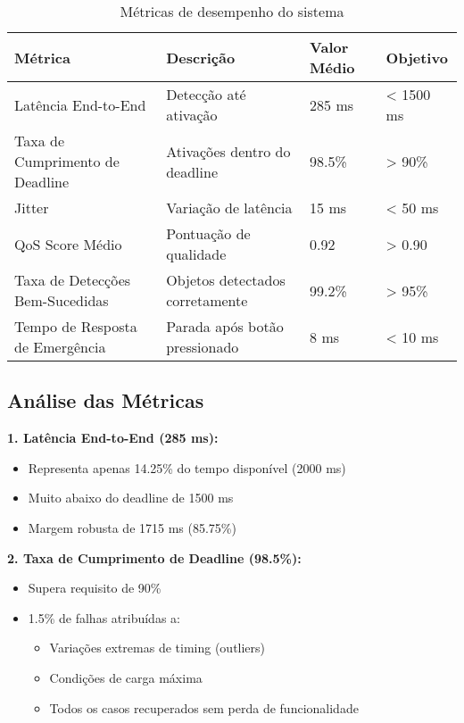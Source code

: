 \documentclass[12pt,a4paper]{article}
\begin{document}
\begin{table}[H]
\centering
\begin{tabularx}{\textwidth}{lXll}
\toprule
\textbf{Métrica} & \textbf{Descrição} & \textbf{Valor Médio} & \textbf{Objetivo} \\
\midrule
Latência End-to-End & Detecção até ativação & 285 ms & < 1500 ms \\
Taxa de Cumprimento de Deadline & Ativações dentro do deadline & 98.5\% & > 90\% \\
Jitter & Variação de latência & 15 ms & < 50 ms \\
QoS Score Médio & Pontuação de qualidade & 0.92 & > 0.90 \\
Taxa de Detecções Bem-Sucedidas & Objetos detectados corretamente & 99.2\% & > 95\% \\
Tempo de Resposta de Emergência & Parada após botão pressionado & 8 ms & < 10 ms \\
\bottomrule
\end{tabularx}
\caption{Métricas de desempenho do sistema}
\end{table}

\subsection{Análise das Métricas}

\textbf{1. Latência End-to-End (285 ms):}
\begin{itemize}
    \item Representa apenas 14.25\% do tempo disponível (2000 ms)
    \item Muito abaixo do deadline de 1500 ms
    \item Margem robusta de 1715 ms (85.75\%)
\end{itemize}

\textbf{2. Taxa de Cumprimento de Deadline (98.5\%):}
\begin{itemize}
    \item Supera requisito de 90\%
    \item 1.5\% de falhas atribuídas a:
    \begin{itemize}
        \item Variações extremas de timing (outliers)
        \item Condições de carga máxima
        \item Todos os casos recuperados sem perda de funcionalidade
    \end{itemize}
\end{itemize}
\end{document}
